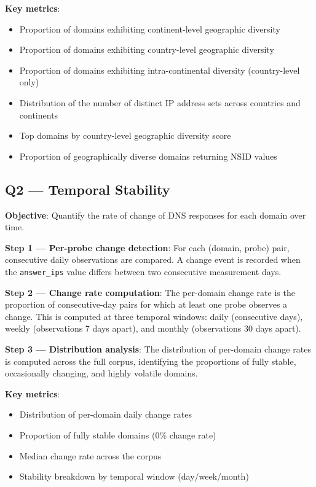 \textbf{Key metrics}:
\begin{itemize}
  \item Proportion of domains exhibiting continent-level geographic diversity
  \item Proportion of domains exhibiting country-level geographic diversity
  \item Proportion of domains exhibiting intra-continental diversity (country-level only)
  \item Distribution of the number of distinct \ac{IP} address sets across countries and continents
  \item Top domains by country-level geographic diversity score
  \item Proportion of geographically diverse domains returning \ac{NSID} values
\end{itemize}

\subsection{Q2 --- Temporal Stability}
\label{subsec:3.5.2}

\textbf{Objective}: Quantify the rate of change of \ac{DNS} responses for each domain over time.

\textbf{Step 1 --- Per-probe change detection}: For each (domain, probe) pair, consecutive daily observations are compared. A change event is recorded when the \texttt{answer\_ips} value differs between two consecutive measurement days.

\textbf{Step 2 --- Change rate computation}: The per-domain change rate is the proportion of consecutive-day pairs for which at least one probe observes a change. This is computed at three temporal windows: daily (consecutive days), weekly (observations 7 days apart), and monthly (observations 30 days apart).

\textbf{Step 3 --- Distribution analysis}: The distribution of per-domain change rates is computed across the full corpus, identifying the proportions of fully stable, occasionally changing, and highly volatile domains.

\textbf{Key metrics}:
\begin{itemize}
  \item Distribution of per-domain daily change rates
  \item Proportion of fully stable domains (0\% change rate)
  \item Median change rate across the corpus
  \item Stability breakdown by temporal window (day/week/month)
\end{itemize}

